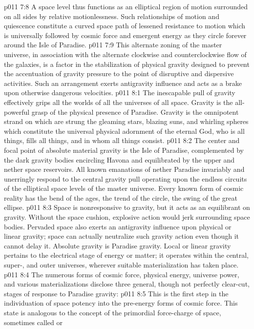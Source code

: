 \vs p011 7:8 A space level thus functions as an elliptical region of motion surrounded on all sides by relative motionlessness. Such relationships of motion and quiescence constitute a curved space path of lessened resistance to motion which is universally followed by cosmic force and emergent energy as they circle forever around the Isle of Paradise.\plusone
\vs p011 7:9 This alternate zoning of the master universe, in association with the alternate clockwise and counterclockwise flow of the galaxies, is a factor in the stabilization of physical gravity designed to prevent the accentuation of gravity pressure to the point of disruptive and dispersive activities. Such an arrangement exerts antigravity influence and acts as a brake upon otherwise dangerous velocities.
\vs p011 8:1 The inescapable pull of gravity effectively grips all the worlds of all the universes of all space. Gravity is the all\hyp{}powerful grasp of the physical presence of Paradise. Gravity is the omnipotent strand on which are strung the gleaming stars, blazing suns, and whirling spheres which constitute the universal physical adornment of the eternal God, who is all things, fills all things, and in whom all things consist.
\vs p011 8:2 The center and focal point of absolute material gravity is the Isle of Paradise, complemented by the dark gravity bodies encircling Havona and equilibrated by the upper and nether space reservoirs. All known emanations of nether Paradise invariably and unerringly respond to the central gravity pull operating upon the endless circuits of the elliptical space levels of the master universe. Every known form of cosmic reality has the bend of the ages, the trend of the circle, the swing of the great ellipse.\plusone
\vs p011 8:3 Space is nonresponsive to gravity, but it acts as an equilibrant on gravity. Without the space cushion, explosive action would jerk surrounding space bodies. Pervaded space also exerts an antigravity influence upon physical or linear gravity; space can actually neutralize such gravity action even though it cannot delay it. Absolute gravity is Paradise gravity. Local or linear gravity pertains to the electrical stage of energy or matter; it operates within the central, super-, and outer universes, wherever suitable materialization has taken place.
\pc \vs p011 8:4 The numerous forms of cosmic force, physical energy, universe power, and various materializations disclose three general, though not perfectly clear\hyp{}cut, stages of response to Paradise gravity:
\pc \vs p011 8:5 \bibnobreakspace {} This is the first step in the individuation of space potency into the pre\hyp{}energy forms of cosmic force. This state is analogous to the concept of the primordial force\hyp{}charge of space, sometimes called  or 
